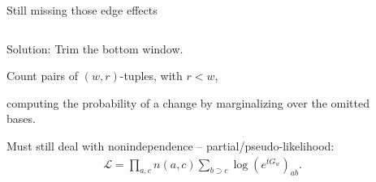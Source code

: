\documentclass[smaller]{beamer}
\begin{document}
\begin{frame}{Still missing those edge effects}

  \begin{columns}[c]
    \begin{column}{.4\textwidth}

      {\newthing Solution:} Trim the bottom window.

      \vspace{1em}

      Count pairs of $(w,r)$-tuples, with $r<w$,

      \vspace{1em}

      computing the probability of a change by marginalizing over the omitted bases.

      \vspace{1em}

  Must still deal with nonindependence --
  partial/pseudo-likelihood: 
  \begin{align*}
    \mathcal{L} = \prod_{a,c} n(a,c) \sum_{b \supset c} \log \left( e^{tG_w} \right)_{ab} .
  \end{align*}

    \end{column}
    \begin{column}{.6\textwidth}


\end{column}
\end{columns}
\end{frame}
\end{document}
